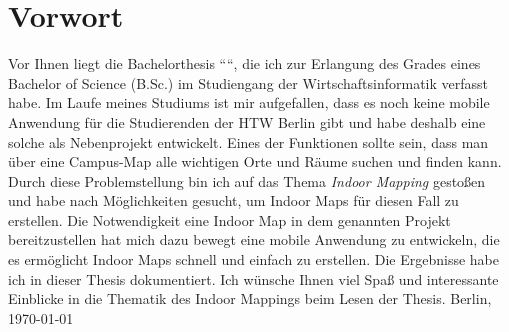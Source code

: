 \chapter*{Vorwort}
Vor Ihnen liegt die Bachelorthesis ``\thetitle``, die ich zur Erlangung des Grades eines Bachelor of Science (B.Sc.) im Studiengang der Wirtschaftsinformatik verfasst habe.
\pbreak
Im Laufe meines Studiums ist mir aufgefallen, dass es noch keine mobile Anwendung für die Studierenden der HTW Berlin gibt und habe deshalb eine solche als Nebenprojekt entwickelt.
Eines der Funktionen sollte sein, dass man über eine Campus-Map alle wichtigen Orte und Räume suchen und finden kann.
Durch diese Problemstellung bin ich auf das Thema \textit{Indoor Mapping} gestoßen und habe nach Möglichkeiten gesucht, um Indoor Maps für diesen Fall zu erstellen.
Die Notwendigkeit eine Indoor Map in dem genannten Projekt bereitzustellen hat mich dazu bewegt eine mobile Anwendung zu entwickeln, die es ermöglicht Indoor Maps schnell und einfach zu erstellen.
Die Ergebnisse habe ich in dieser Thesis dokumentiert.
\pbreak
Ich wünsche Ihnen viel Spaß und interessante Einblicke in die Thematik des Indoor Mappings beim Lesen der Thesis.
\pbreak
\theauthor
\pbreak
Berlin, \today
\clearpage
